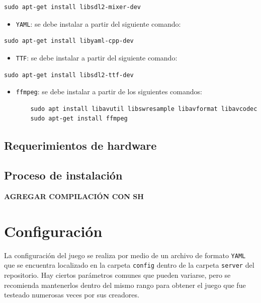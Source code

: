 \documentclass[a4paper]{article}
\begin{document}
\begin{verbatim}
sudo apt-get install libsdl2-mixer-dev
\end{verbatim}

\begin{itemize}
	\item \texttt{YAML}: se debe instalar a partir del siguiente comando:
\end{itemize}

\begin{verbatim}
sudo apt-get install libyaml-cpp-dev
\end{verbatim}

\begin{itemize}
	\item \texttt{TTF}: se debe instalar a partir del siguiente comando:
\end{itemize}

\begin{verbatim}
sudo apt-get install libsdl2-ttf-dev
\end{verbatim}

\begin{itemize}
	\item \texttt{ffmpeg}: se debe instalar a partir de los siguientes comandos:
	
	\begin{verbatim}
	sudo apt install libavutil libswresample libavformat libavcodec
	sudo apt-get install ffmpeg
	\end{verbatim}
\end{itemize}

\subsection{Requerimientos de hardware}

\subsection{Proceso de instalación}

\textbf{AGREGAR COMPILACIÓN CON SH}

\section{Configuración}

La configuración del juego se realiza por medio de un archivo de formato \texttt{YAML} que se encuentra localizado en la carpeta \texttt{config} dentro de la carpeta \texttt{server} del repositorio. Hay ciertos parámetros comunes que pueden variarse, pero se recomienda mantenerlos dentro del mismo rango para obtener el juego que fue testeado numerosas veces por sus creadores.
\end{document}
